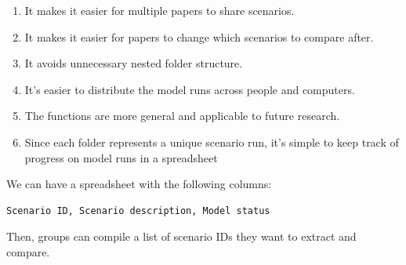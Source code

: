 \documentclass[12pt]{article}
\begin{document}
\begin{enumerate}
  \item It makes it easier for multiple papers to share scenarios.

  \item It makes it easier for papers to change which scenarios to compare 
    after.

  \item It avoids unnecessary nested folder structure.

  \item It's easier to distribute the model runs across people and computers.

  \item The functions are more general and applicable to future research.

  \item Since each folder represents a unique scenario run, it's simple to keep 
    track of progress on model runs in a spreadsheet
  
\end{enumerate}

\noindent
We can have a spreadsheet with the following columns:

\begin{verbatim}
Scenario ID, Scenario description, Model status
\end{verbatim}

\noindent
Then, groups can compile a list of scenario IDs they want to extract and 
compare.








\end{document}
